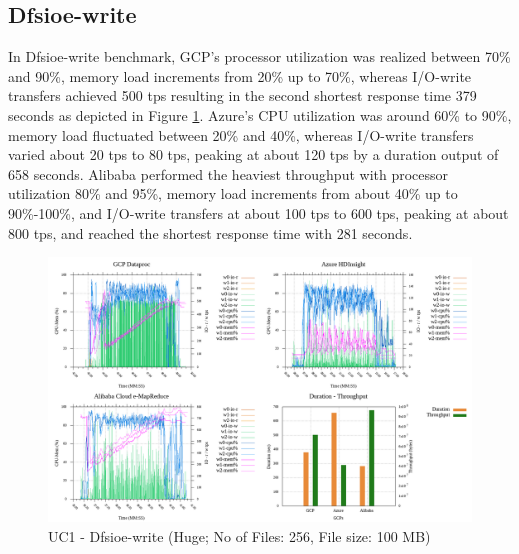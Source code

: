 \documentclass[review]{elsarticle}
\begin{document}
\subsection{Dfsioe-write}
In Dfsioe-write benchmark, GCP's processor utilization was realized between 70\% and 90\%, memory load increments from 20\% up to 70\%, whereas I/O-write transfers achieved 500 tps resulting in the second shortest response time 379 seconds as depicted in Figure \ref{fig:uc1-dfsioew-h-cmidt}. Azure's CPU utilization was around 60\% to 90\%, memory load fluctuated between 20\% and 40\%, whereas I/O-write transfers varied about 20 tps to 80 tps, peaking at about 120 tps by a duration output of 658 seconds. Alibaba performed the heaviest throughput with processor utilization 80\% and 95\%, memory load increments from about 40\% up to 90\%-100\%, and I/O-write transfers at about 100 tps to 600 tps, peaking at about 800 tps, and reached the shortest response time with 281 seconds.

\begin{figure}[p]
	\caption{UC1 - Dfsioe-write (Huge; No of Files: 256, File size: 100 MB)}
	\label{fig:uc1-dfsioew-h-cmidt}
	\includegraphics[width=\textwidth]{uc1-dfsioew-h-cmidt}
	\centering
\end{figure}
\end{document}
